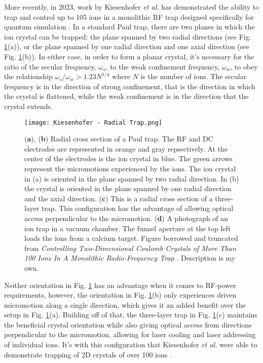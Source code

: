 More recently, in 2023, work by Kiesenhofer \textit{et al.} has demonstrated the ability to trap and control up to 105  ions in a monolithic RF trap designed specifically for quantum simulation \cite{Kiesenhofer}. In a standard Paul trap, there are two planes in which the ion crystal can be trapped: the plane spanned by two radial directions (see Fig. \ref{fig:Radial Traps}(a)), or the plane spanned by one radial direction and one axial direction (see Fig. \ref{fig:Radial Traps}(b)). In either case, in order to form a planar crystal, it's necessary for the ratio of the secular frequency, $\omega_s$, to the weak confinement frequency, $\omega_w$, to obey the relationship $\omega_s/\omega_w > 1.23 N^{1/4}$ where $N$ is the number of ions. The secular frequency is in the direction of strong confinement, that is the direction in which the crystal is flattened, while the weak confinement is in the direction that the crystal extends.
\begin{figure}
    \texttt{[image: Kiesenhofer - Radial Trap.png]}
    \caption{(\textbf{a}), (\textbf{b}) Radial cross section of a Paul trap. The RF and DC electrodes are represented in orange and gray repsectively. At the center of the electrodes is the ion crystal in blue. The green arrows represent the micromotions experienced by the ions. The ion crystal in (a) is oriented in the plane spanned by two radial direction. In (b) the crystal is oriented in the plane spanned by one radial direction and the axial direction. (\textbf{c}) This is a radial cross section of a three-layer trap. This configuration has the advantage of allowing optical access perpendicular to the micromotion. (\textbf{d}) A photograph of an ion trap in a vacuum chamber. The funnel aperture at the top left loads the ions from a calcium target. Figure borrowed and truncated from \textit{Controlling Two-Dimensional Coulomb Crystals of More Than 100 Ions In A Monolithic Radio-Frequency Trap} \cite{Kiesenhofer}. Description is my own.}
    \label{fig:Radial Traps}
\end{figure} 

Neither orientation in Fig. \ref{fig:Radial Traps} has an advantage when it comes to RF-power requirements, however, the orientation in Fig. \ref{fig:Radial Traps}(b) only experiences driven micromotion along a single direction, which gives it an added benefit over the setup in Fig. \ref{fig:Radial Traps}(a). Building off of that, the three-layer trap in Fig. \ref{fig:Radial Traps}(c) maintains the beneficial crystal orientation while also giving optical access from directions perpendicular to the micromotion, allowing for laser cooling and laser addressing of individual ions. It's with this configuration that Kiesenhofer \textit{et al.} were able to demonstrate trapping of 2D crystals of over 100 ions \cite{Kiesenhofer}.


